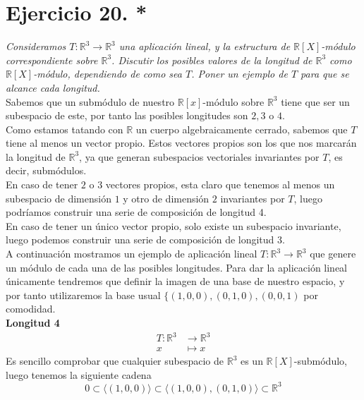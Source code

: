 \section{Ejercicio 20. *} \textit{Consideramos \(T:\mathbb{R}^3 \to
  \mathbb{R}^3\) una aplicación lineal, y la estructura de
  \(\mathbb{R}[X]\)-módulo correspondiente sobre \(\mathbb{R}^3\). Discutir los
  posibles valores de la longitud de \(\mathbb{R}^3\) como
  \(\mathbb{R}[X]\)-módulo, dependiendo de como sea \(T\). Poner un ejemplo de
  \(T\) para que se alcance cada longitud.}\\

Sabemos que un submódulo de nuestro \(\mathbb{R}[x]\)-módulo sobre
\(\mathbb{R}^3\) tiene  que ser un subespacio de este, por tanto las posibles
longitudes son \(2,3\) o \(4\).\\

Como estamos tatando con \(\mathbb{R}\) un cuerpo algebraicamente cerrado,
sabemos que \(T\) tiene al menos un vector propio. Estos vectores propios son
los que nos marcarán la longitud de \(\mathbb{R}^3\), ya que generan subespacios
vectoriales invariantes por \(T\), es decir, submódulos.\\

En caso de tener \(2\) o \(3\) vectores propios, esta claro que tenemos al menos
un subespacio de dimensión \(1\) y otro de dimensión \(2\) invariantes por
\(T\), luego podríamos construir una serie de composición de longitud 4.\\

En caso de tener un único vector propio, solo existe un subespacio invariante,
luego podemos construir una serie de composición de longitud 3.\\


A continuación mostramos un ejemplo de aplicación lineal \(T:\mathbb{R}^3 \rightarrow \mathbb{R}^3\) que genere un módulo de cada una de las posibles longitudes.
Para dar la aplicación lineal únicamente tendremos que definir la imagen de una base de nuestro espacio, y por tanto utilizaremos la base usual
\(\{(1,0,0), (0,1,0), (0,0,1)\) por comodidad.\\

\textbf{Longitud 4}%
\[
\begin{aligned}
  T:\mathbb{R}^3 &\rightarrow \mathbb{R}^3\\
  x &\mapsto x
\end{aligned}
\]
Es sencillo comprobar que cualquier subespacio de \(\mathbb{R}^3\) es un
\(\mathbb{R}[X]\)-submódulo, luego tenemos la siguiente cadena
\[
        0 \subset \langle (1,0,0) \rangle \subset \langle (1,0,0), (0,1,0)
        \rangle \subset \mathbb{R}^3
\]

